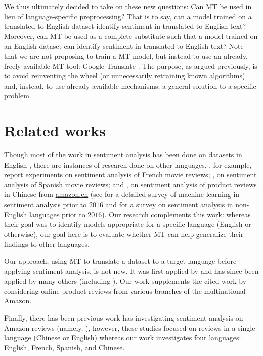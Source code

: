 \documentclass[11pt,a4paper]{article}
\newcommand{\amazon}[1]{\href{http://www.amazon.#1}{amazon.#1}}
\begin{document}
We thus ultimately decided to take on these new questions: Can MT be used in lieu of language-specific preprocessing? That is to say, can a model trained on a translated-to-English dataset identify sentiment in translated-to-English text? Moreover, can MT be used as a complete substitute such that a model trained on an English dataset can identify sentiment in translated-to-English text? Note that we are not proposing to train a MT model, but instead to use an already, freely available MT tool: Google Translate \cite{GoogleTranslate}. The purpose, as argued previously, is to avoid reinventing the wheel (or unnecessarily retraining known algorithms) and, instead, to use already available mechanisms; a general solution to a specific problem.

\section{Related works}
Though most of the work in sentiment analysis has been done on datasets in English \cite{aydougan2016comprehensive, balahur2012multilingual, ghorbel2011sentiment, korayem2016sentiment, pang2008opinion}, there are instances of research done on other languages. \citet{ghorbel2011sentiment}, for example, report experiments on sentiment analysis of French movie reviews; \citet{martin2013sentiment}, on sentiment analysis of Spanish movie reviews; and \citet{chen2018fine}, on sentiment analysis of product reviews in Chinese from \amazon{cn} (see \citet{aydougan2016comprehensive} for a detailed survey of machine learning in sentiment analysis prior to $2016$ and \citet{korayem2016sentiment} for a survey on sentiment analysis in non-English languages prior to $2016$). Our research complements this work: whereas their goal was to identify models appropriate for a specific language (English or otherwise), our goal here is to evaluate whether MT can help generalize their findings to other languages.

Our approach, using MT to translate a dataset to a target language before applying sentiment analysis, is not new. It was first applied by \citet{bautin2008international} and has since been applied by many others (including \citealp{balahur2012multilingual, brooke2009cross, martin2013sentiment}). Our work supplements the cited work by considering online product reviews from various branches of the multinational Amazon.

Finally, there has been previous work has investigating sentiment analysis on Amazon reviews (namely, \citealp{chen2018fine, glorot2011domain, rain2013sentiment}), however, these studies focused on reviews in a single language (Chinese or English) whereas our work investigates four languages: English, French, Spanish, and Chinese.
\end{document}
